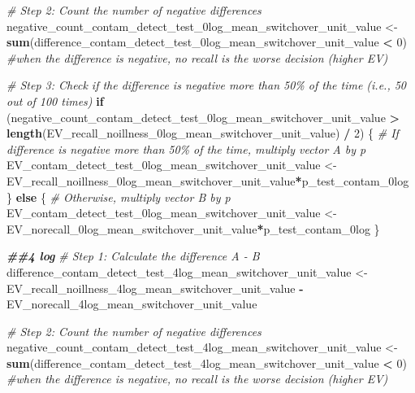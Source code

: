 \documentclass[
]{article}
\newenvironment{Shaded}{\begin{snugshade}}{\end{snugshade}}
\newcommand{\CommentTok}[1]{\textcolor[rgb]{0.56,0.35,0.01}{\textit{#1}}}
\newcommand{\ControlFlowTok}[1]{\textcolor[rgb]{0.13,0.29,0.53}{\textbf{#1}}}
\newcommand{\DecValTok}[1]{\textcolor[rgb]{0.00,0.00,0.81}{#1}}
\newcommand{\DocumentationTok}[1]{\textcolor[rgb]{0.56,0.35,0.01}{\textbf{\textit{#1}}}}
\newcommand{\FunctionTok}[1]{\textcolor[rgb]{0.13,0.29,0.53}{\textbf{#1}}}
\newcommand{\NormalTok}[1]{#1}
\newcommand{\OtherTok}[1]{\textcolor[rgb]{0.56,0.35,0.01}{#1}}
\newcommand{\SpecialCharTok}[1]{\textcolor[rgb]{0.81,0.36,0.00}{\textbf{#1}}}
\begin{document}
\begin{Shaded}
\begin{Highlighting}[]
\CommentTok{\# Step 2: Count the number of negative differences}
\NormalTok{negative\_count\_contam\_detect\_test\_0log\_mean\_switchover\_unit\_value }\OtherTok{\textless{}{-}} \FunctionTok{sum}\NormalTok{(difference\_contam\_detect\_test\_0log\_mean\_switchover\_unit\_value }\SpecialCharTok{\textless{}} \DecValTok{0}\NormalTok{) }\CommentTok{\#when the difference is negative, no recall is the worse decision (higher EV)}

\CommentTok{\# Step 3: Check if the difference is negative more than 50\% of the time (i.e., 50 out of 100 times)}
\ControlFlowTok{if}\NormalTok{ (negative\_count\_contam\_detect\_test\_0log\_mean\_switchover\_unit\_value }\SpecialCharTok{\textgreater{}} \FunctionTok{length}\NormalTok{(EV\_recall\_noillness\_0log\_mean\_switchover\_unit\_value) }\SpecialCharTok{/} \DecValTok{2}\NormalTok{) \{}
  \CommentTok{\# If difference is negative more than 50\% of the time, multiply vector A by p}
\NormalTok{  EV\_contam\_detect\_test\_0log\_mean\_switchover\_unit\_value }\OtherTok{\textless{}{-}}\NormalTok{ EV\_recall\_noillness\_0log\_mean\_switchover\_unit\_value}\SpecialCharTok{*}\NormalTok{p\_test\_contam\_0log}
\NormalTok{\} }\ControlFlowTok{else}\NormalTok{ \{}
  \CommentTok{\# Otherwise, multiply vector B by p}
\NormalTok{ EV\_contam\_detect\_test\_0log\_mean\_switchover\_unit\_value  }\OtherTok{\textless{}{-}}\NormalTok{ EV\_norecall\_0log\_mean\_switchover\_unit\_value}\SpecialCharTok{*}\NormalTok{p\_test\_contam\_0log}
\NormalTok{\}}



\DocumentationTok{\#\#4 log}
\CommentTok{\# Step 1: Calculate the difference A {-} B}
\NormalTok{difference\_contam\_detect\_test\_4log\_mean\_switchover\_unit\_value }\OtherTok{\textless{}{-}}\NormalTok{ EV\_recall\_noillness\_4log\_mean\_switchover\_unit\_value }\SpecialCharTok{{-}}\NormalTok{ EV\_norecall\_4log\_mean\_switchover\_unit\_value}

\CommentTok{\# Step 2: Count the number of negative differences}
\NormalTok{negative\_count\_contam\_detect\_test\_4log\_mean\_switchover\_unit\_value }\OtherTok{\textless{}{-}} \FunctionTok{sum}\NormalTok{(difference\_contam\_detect\_test\_4log\_mean\_switchover\_unit\_value }\SpecialCharTok{\textless{}} \DecValTok{0}\NormalTok{) }\CommentTok{\#when the difference is negative, no recall is the worse decision (higher EV)}


\end{Highlighting}
\end{Shaded}
\end{document}
